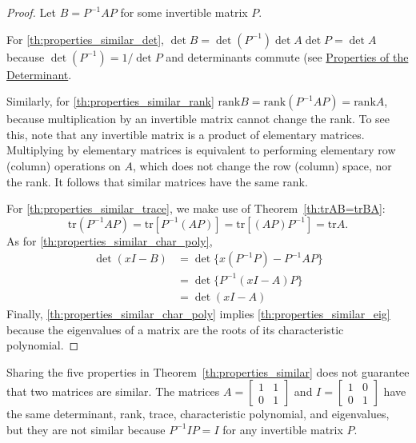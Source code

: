 \documentclass{ximera}
\begin{document}
\begin{proof}
Let $B = P^{-1}AP$ for some invertible matrix $P$. 

For \ref{th:properties_similar_det}, $\det B = \det(P^{-1}) \det A \det P = \det A$ because $\det(P^{-1}) = 1/ \det P$ and determinants commute (see \href{https://ximera.osu.edu/oerlinalg/LinearAlgebra/DET-0040/main}{Properties of the Determinant}.

Similarly, for \ref{th:properties_similar_rank} $\mbox{rank} B = \mbox{rank}(P^{-1}AP) = \mbox{rank} A$, because multiplication by an invertible matrix cannot change the rank.  To see this, note that any invertible matrix is a product of elementary matrices.  Multiplying by elementary matrices is equivalent to performing elementary row (column) operations on $A$, which does not change the row (column) space, nor the rank.  It follows that similar matrices have the same rank. 

For \ref{th:properties_similar_trace}, we make use of Theorem~\ref{th:trAB=trBA}:
\begin{equation*}
\mbox{tr} (P^{-1}AP) = \mbox{tr}[P^{-1}(AP)] = \mbox{tr}[(AP)P^{-1}] = \mbox{tr} A.
\end{equation*}
As for \ref{th:properties_similar_char_poly},
\begin{align*}
\det(xI - B) &= \det \{x(P^{-1}P) - P^{-1}AP\} \\
&= \det \{ P^{-1}(xI - A)P\} \\
&= \det (xI - A)
\end{align*}
Finally, \ref{th:properties_similar_char_poly} implies \ref{th:properties_similar_eig} because the eigenvalues of a matrix are the roots of its characteristic polynomial.
\end{proof}

\begin{remark}
Sharing the five properties in Theorem~\ref{th:properties_similar} does not guarantee that two matrices are similar. The matrices
$A = \begin{bmatrix}
1 & 1 \\
0 & 1
\end{bmatrix}$ and $I = \begin{bmatrix}
1 & 0 \\
0 & 1
\end{bmatrix}$ have the same determinant, rank, trace, characteristic polynomial, and eigenvalues, but they are not similar because $P^{-1}IP = I$ for any invertible matrix $P$.
\end{remark}
\end{document}
